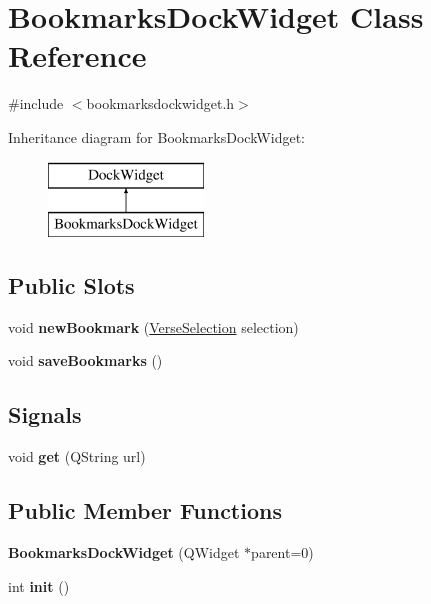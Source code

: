 \hypertarget{classBookmarksDockWidget}{
\section{BookmarksDockWidget Class Reference}
\label{classBookmarksDockWidget}
}


{\ttfamily \#include $<$bookmarksdockwidget.h$>$}

Inheritance diagram for BookmarksDockWidget:\begin{figure}[H]
\begin{center}
\leavevmode
\includegraphics[height=2cm]{classBookmarksDockWidget}
\end{center}
\end{figure}
\subsection*{Public Slots}
\begin{DoxyCompactItemize}
\item 
\hypertarget{classBookmarksDockWidget_a641a58df04e7c420e13211e6478ff6a2}{
void {\bfseries newBookmark} (\hyperlink{classVerseSelection}{VerseSelection} selection)}
\label{classBookmarksDockWidget_a641a58df04e7c420e13211e6478ff6a2}

\item 
\hypertarget{classBookmarksDockWidget_a33e94305656eb55eb0c29f7279d00e8c}{
void {\bfseries saveBookmarks} ()}
\label{classBookmarksDockWidget_a33e94305656eb55eb0c29f7279d00e8c}

\end{DoxyCompactItemize}
\subsection*{Signals}
\begin{DoxyCompactItemize}
\item 
\hypertarget{classBookmarksDockWidget_a9891888ad26043df89a56f9c7fc6c753}{
void {\bfseries get} (QString url)}
\label{classBookmarksDockWidget_a9891888ad26043df89a56f9c7fc6c753}

\end{DoxyCompactItemize}
\subsection*{Public Member Functions}
\begin{DoxyCompactItemize}
\item 
\hypertarget{classBookmarksDockWidget_a0e8922229b7f74f463de678899e6f33f}{
{\bfseries BookmarksDockWidget} (QWidget $\ast$parent=0)}
\label{classBookmarksDockWidget_a0e8922229b7f74f463de678899e6f33f}

\item 
\hypertarget{classBookmarksDockWidget_ad36126321cba613671667ebc64de8fe3}{
int {\bfseries init} ()}
\label{classBookmarksDockWidget_ad36126321cba613671667ebc64de8fe3}

\end{DoxyCompactItemize}
